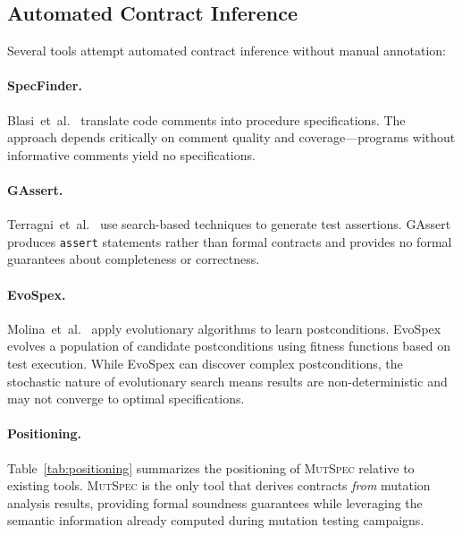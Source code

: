 \documentclass[11pt]{article}
\begin{document}
\subsection{Automated Contract Inference}
\label{sec:inference}

Several tools attempt automated contract inference without manual annotation:

\paragraph{SpecFinder.} Blasi~et~al.~\cite{blasi2018} translate code comments
into procedure specifications. The approach depends critically on comment quality
and coverage---programs without informative comments yield no specifications.

\paragraph{GAssert.} Terragni~et~al.~\cite{terragni2021} use search-based
techniques to generate test assertions. GAssert produces \texttt{assert}
statements rather than formal contracts and provides no formal guarantees about
completeness or correctness.

\paragraph{EvoSpex.} Molina~et~al.~\cite{molina2021} apply evolutionary
algorithms to learn postconditions. EvoSpex evolves a population of candidate
postconditions using fitness functions based on test execution. While EvoSpex can
discover complex postconditions, the stochastic nature of evolutionary search
means results are non-deterministic and may not converge to optimal
specifications.

\paragraph{Positioning.} Table~\ref{tab:positioning} summarizes the positioning
of \textsc{MutSpec} relative to existing tools. \textsc{MutSpec} is the only
tool that derives contracts \emph{from} mutation analysis results, providing
formal soundness guarantees while leveraging the semantic information already
computed during mutation testing campaigns.
\end{document}
